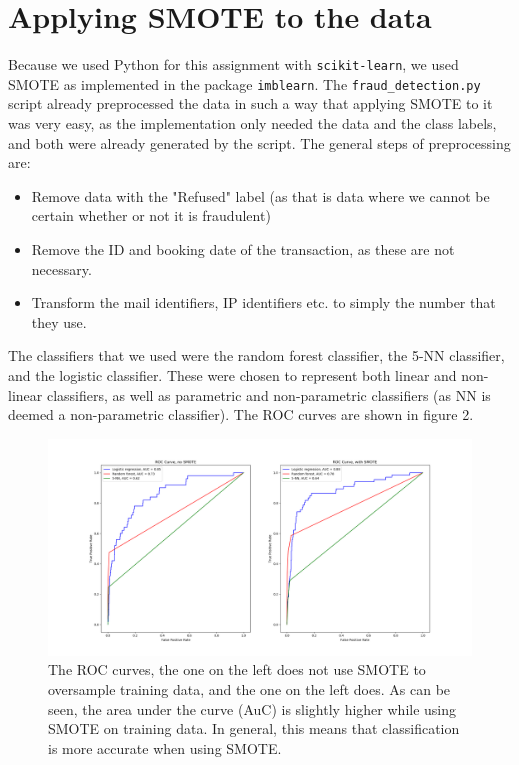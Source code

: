 \documentclass[]{article}
\begin{document}
\section{Applying SMOTE to the data}
Because we used Python for this assignment with \texttt{scikit-learn}, we used SMOTE as implemented in the package \texttt{imblearn}. The \texttt{fraud\_detection.py} script already preprocessed the data in such a way that applying SMOTE to it was very easy, as the implementation only needed the data and the class labels, and both were already generated by the script. The general steps of preprocessing are: 
\begin{itemize}
	\item Remove data with the "Refused" label (as that is data where we cannot be certain whether or not it is fraudulent)
	\item Remove the ID and booking date of the transaction, as these are not necessary.
	\item Transform the mail identifiers, IP identifiers etc. to simply the number that they use.
\end{itemize}
The classifiers that we used were the random forest classifier, the 5-NN classifier, and the logistic classifier. These were chosen to represent both linear and non-linear classifiers, as well as parametric and non-parametric classifiers (as NN is deemed a non-parametric classifier). The ROC curves are shown in figure 2.
\begin{figure}[h!]
	\centering
	\includegraphics[scale = 0.27]{Visualizations/ROC_curves}
	\caption{The ROC curves, the one on the left does not use SMOTE to oversample training data, and the one on the left does. As can be seen, the area under the curve (AuC) is slightly higher while using SMOTE on training data. In general, this means that classification is more accurate when using SMOTE.}
\end{figure}
\clearpage
\end{document}
